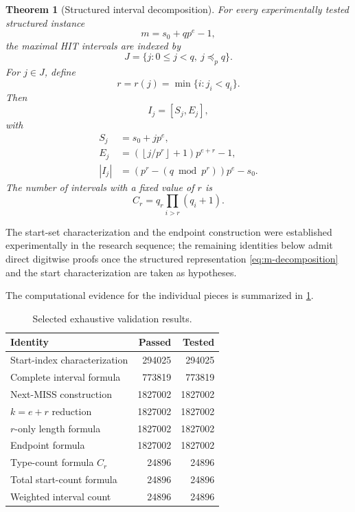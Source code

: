 \documentclass[11pt,a4paper]{article}
\newtheorem{theorem}{Theorem}[section]
\theoremstyle{definition}
\theoremstyle{remark}
\newcommand{\floor}[1]{\left\lfloor #1\right\rfloor}
\begin{document}
\begin{theorem}[Structured interval decomposition]
For every experimentally tested structured instance
\[
 m=s_0+qp^e-1,
\]
the maximal HIT intervals are indexed by
\[
 J=\{j:0\le j<q,\ j\preceq_p q\}.
\]
For $j\in J$, define
\[
 r=r(j)=\min\{i:j_i<q_i\}.
\]
Then
\begin{equation}
 I_j=[S_j,E_j],
\end{equation}
with
\begin{align}
 S_j&=s_0+jp^e,
 \label{eq:complete-start}\\
 E_j&=\left(\floor{j/p^r}+1\right)p^{e+r}-1,
 \label{eq:complete-end}\\
 |I_j|&=\left(p^r-(q\bmod p^r)\right)p^e-s_0.
 \label{eq:complete-length}
\end{align}
The number of intervals with a fixed value of $r$ is
\[
 C_r=q_r\prod_{i>r}(q_i+1).
\]
\end{theorem}

The start-set characterization and the endpoint construction were established experimentally in the research sequence; the remaining identities below admit direct digitwise proofs once the structured representation \eqref{eq:m-decomposition} and the start characterization are taken as hypotheses.

The computational evidence for the individual pieces is summarized in \cref{tab:validation}.

\begin{table}[ht]
\centering
\caption{Selected exhaustive validation results.}
\label{tab:validation}
\begin{tabular}{@{}lrr@{}}
\toprule
Identity & Passed & Tested \\
\midrule
Start-index characterization & 294025 & 294025 \\
Complete interval formula & 773819 & 773819 \\
Next-MISS construction & 1827002 & 1827002 \\
$k=e+r$ reduction & 1827002 & 1827002 \\
$r$-only length formula & 1827002 & 1827002 \\
Endpoint formula & 1827002 & 1827002 \\
Type-count formula $C_r$ & 24896 & 24896 \\
Total start-count formula & 24896 & 24896 \\
Weighted interval count & 24896 & 24896 \\
\bottomrule
\end{tabular}
\end{table}
\end{document}
